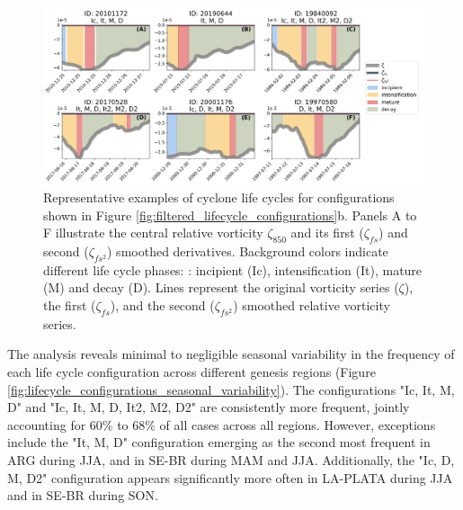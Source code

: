 \begin{figure}[h!]
\centering
\includegraphics[width=\textwidth]{figs_4/main_species_life-cycle.png}
\caption{Representative examples of cyclone life cycles for configurations shown in Figure \ref{fig:filtered_lifecycle_configurations}b. Panels A to F illustrate the central relative vorticity \(\zeta_{850}\) and its first (\(\zeta_{fs}\)) and second (\(\zeta_{fs^2}\)) smoothed derivatives. Background colors indicate different life cycle phases: : incipient (Ic), intensification (It), mature (M) and decay (D). Lines represent the original vorticity series (\(\zeta\)), the first (\(\zeta_{fs}\)), and the second (\(\zeta_{fs^2}\)) smoothed relative vorticity series.}
\label{fig:representative_life_cycles}
\end{figure}

The analysis reveals minimal to negligible seasonal variability in the frequency of each life cycle configuration across different genesis regions (Figure \ref{fig:lifecycle_configurations_seasonal_variability}). The configurations "Ic, It, M, D" and "Ic, It, M, D, It2, M2, D2" are consistently more frequent, jointly accounting for 60\% to 68\% of all cases across all regions. However, exceptions include the "It, M, D" configuration emerging as the second most frequent in ARG during JJA, and in SE-BR during MAM and JJA. Additionally, the "Ic, D, M, D2" configuration appears significantly more often in LA-PLATA during JJA and in SE-BR during SON.


